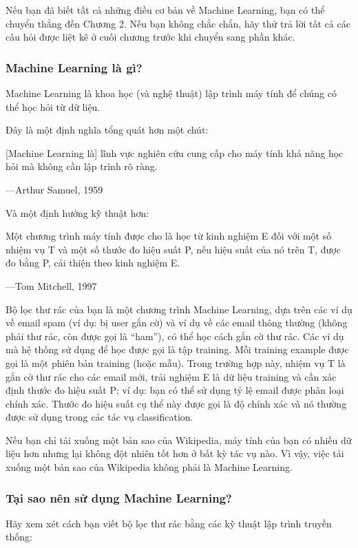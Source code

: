 Nếu bạn đã biết tất cả những điều cơ bản về Machine Learning, bạn có thể chuyển thẳng đến Chương 2. Nếu bạn không chắc chắn, hãy thử trả lời tất cả các câu hỏi được liệt kê ở cuối chương trước khi chuyển sang phần khác.

\subsubsection{Machine Learning là gì?}

Machine Learning là khoa học (và nghệ thuật) lập trình máy tính để chúng có thể học hỏi từ dữ liệu.

Đây là một định nghĩa tổng quát hơn một chút:

[Machine Learning là] lĩnh vực nghiên cứu cung cấp cho máy tính khả năng học hỏi mà không cần lập trình rõ ràng.

—Arthur Samuel, 1959

Và một định hướng kỹ thuật hơn:

Một chương trình máy tính được cho là học từ kinh nghiệm E đối với một số nhiệm vụ T và một số thước đo hiệu suất P, nếu hiệu suất của nó trên T, được đo bằng P, cải thiện theo kinh nghiệm E.

—Tom Mitchell, 1997

Bộ lọc thư rác của bạn là một chương trình Machine Learning, dựa trên các ví dụ về email spam (ví dụ: bị user gắn cờ) và ví dụ về các email thông thường (không phải thư rác, còn được gọi là “ham”), có thể học cách gắn cờ thư rác. Các ví dụ mà hệ thống sử dụng để học được gọi là tập training. Mỗi training example được gọi là một phiên bản training (hoặc mẫu). Trong trường hợp này, nhiệm vụ T là gắn cờ thư rác cho các email mới, trải nghiệm E là dữ liệu training và cần xác định thước đo hiệu suất P; ví dụ: bạn có thể sử dụng tỷ lệ email được phân loại chính xác. Thước đo hiệu suất cụ thể này được gọi là độ chính xác và nó thường được sử dụng trong các tác vụ classification.

Nếu bạn chỉ tải xuống một bản sao của Wikipedia, máy tính của bạn có nhiều dữ liệu hơn nhưng lại không đột nhiên tốt hơn ở bất kỳ tác vụ nào. Vì vậy, việc tải xuống một bản sao của Wikipedia không phải là Machine Learning.

\subsubsection{Tại sao nên sử dụng Machine Learning?}

Hãy xem xét cách bạn viết bộ lọc thư rác bằng các kỹ thuật lập trình truyền thống:

